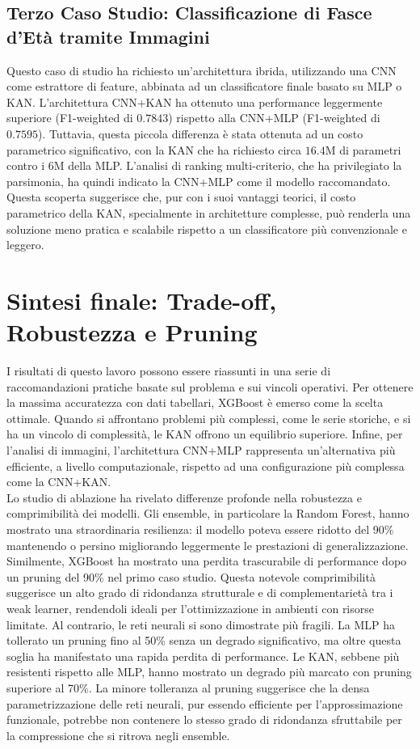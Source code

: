 \documentclass[a4paper,12pt]{report}
\begin{document}
	\subsection*{Terzo Caso Studio: Classificazione di Fasce d'Età tramite Immagini}
	Questo caso di studio ha richiesto un'architettura ibrida, utilizzando una CNN come estrattore di feature, abbinata ad un classificatore finale basato su MLP o KAN. L'architettura CNN+KAN ha ottenuto una performance leggermente superiore (F1-weighted di $0.7843$) rispetto alla CNN+MLP (F1-weighted di $0.7595$). Tuttavia, questa piccola differenza è stata ottenuta ad un costo parametrico significativo, con la KAN che ha richiesto circa $16.4$M di parametri contro i $6$M della MLP. L'analisi di ranking multi-criterio, che ha privilegiato la parsimonia, ha quindi indicato la CNN+MLP come il modello raccomandato. Questa scoperta suggerisce che, pur con i suoi vantaggi teorici, il costo parametrico della KAN, specialmente in architetture complesse, può renderla una soluzione meno pratica e scalabile rispetto a un classificatore più convenzionale e leggero. 
	
	\section*{Sintesi finale: Trade-off, Robustezza e Pruning}
	I risultati di questo lavoro possono essere riassunti in una serie di raccomandazioni pratiche basate sul problema e sui vincoli operativi. Per ottenere la massima accuratezza con dati tabellari, XGBoost è emerso come la scelta ottimale. Quando si affrontano problemi più complessi, come le serie storiche, e si ha un vincolo di complessità, le KAN offrono un equilibrio superiore. Infine, per l'analisi di immagini, l'architettura CNN+MLP rappresenta un'alternativa più efficiente, a livello computazionale, rispetto ad una configurazione più complessa come la CNN+KAN. \\
	Lo studio di ablazione ha rivelato differenze profonde nella robustezza e comprimibilità dei modelli. Gli ensemble, in particolare la Random Forest, hanno mostrato una straordinaria resilienza: il modello poteva essere ridotto del 90\% mantenendo o persino migliorando leggermente le prestazioni di generalizzazione. Similmente, XGBoost ha mostrato una perdita trascurabile di performance dopo un pruning del 90\% nel primo caso studio. Questa notevole comprimibilità suggerisce un alto grado di ridondanza strutturale e di complementarietà tra i weak learner, rendendoli ideali per l'ottimizzazione in ambienti con risorse limitate. Al contrario, le reti neurali si sono dimostrate più fragili. La MLP ha tollerato un pruning fino al 50\% senza un degrado significativo, ma oltre questa soglia ha manifestato una rapida perdita di performance. Le KAN, sebbene più resistenti rispetto alle MLP, hanno mostrato un degrado più marcato con pruning superiore al 70\%. La minore tolleranza al pruning suggerisce che la densa parametrizzazione delle reti neurali, pur essendo efficiente per l'approssimazione funzionale, potrebbe non contenere lo stesso grado di ridondanza sfruttabile per la compressione che si ritrova negli ensemble.
	
\end{document}
